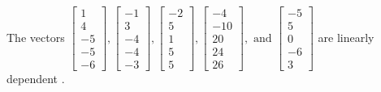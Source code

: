 \begin{exercise}
\begin{exerciseStatement}
  \end{exerciseStatement}
  \begin{exerciseAnswer}
   The vectors \(\left[\begin{array}{r}
1 \\
4 \\
-5 \\
-5 \\
-6
\end{array}\right] , \left[\begin{array}{r}
-1 \\
3 \\
-4 \\
-4 \\
-3
\end{array}\right] , \left[\begin{array}{r}
-2 \\
5 \\
1 \\
5 \\
5
\end{array}\right] , \left[\begin{array}{r}
-4 \\
-10 \\
20 \\
24 \\
26
\end{array}\right] , \text{ and } \left[\begin{array}{r}
-5 \\
5 \\
0 \\
-6 \\
3
\end{array}\right]\) are 
  	 linearly dependent  .
  


  \end{exerciseAnswer}
\end{exercise}